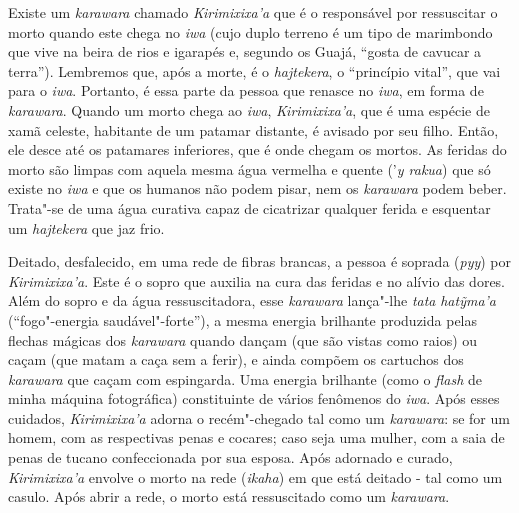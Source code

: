 Existe um \emph{karawara} chamado \emph{Kirimixixa'a} que é o
responsável por ressuscitar o morto quando este chega no \emph{iwa}
(cujo duplo terreno é um tipo de marimbondo que vive na beira de rios e
igarapés e, segundo os Guajá, ``gosta de cavucar a terra''). Lembremos
que, após a morte, é o \emph{hajtekera}, o ``princípio vital'', que vai
para o \emph{iwa}. Portanto, é essa parte da pessoa que renasce no
\emph{iwa}, em forma de \emph{karawara}. Quando um morto chega ao
\emph{iwa}, \emph{Kirimixixa'a}, que é uma espécie de xamã celeste,
habitante de um patamar distante, é avisado por seu filho. Então, ele
desce até os patamares inferiores, que é onde chegam os mortos. As
feridas do morto são limpas com aquela mesma água vermelha e quente
('\emph{y rakua}) que só existe no \emph{iwa} e que os humanos não podem
pisar, nem os \emph{karawara} podem beber. Trata"-se de uma água curativa
capaz de cicatrizar qualquer ferida e esquentar um \emph{hajtekera} que
jaz frio.

Deitado, desfalecido, em uma rede de fibras brancas, a pessoa é soprada
(\emph{pyy}) por \emph{Kirimixixa'a}. Este é o sopro que auxilia na cura
das feridas e no alívio das dores. Além do sopro e da água
ressuscitadora, esse \emph{karawara} lança"-lhe \emph{tata}
\emph{hatỹma'a} (``fogo"-energia saudável"-forte''), a mesma energia
brilhante produzida pelas flechas mágicas dos \emph{karawara} quando
dançam (que são vistas como raios) ou caçam (que matam a caça sem a
ferir), e ainda compõem os cartuchos dos \emph{karawara} que caçam com
espingarda. Uma energia brilhante (como o \emph{flash} de minha máquina
fotográfica) constituinte de vários fenômenos do \emph{iwa}. Após esses
cuidados, \emph{Kirimixixa'a} adorna o recém"-chegado tal como um
\emph{karawara}: se for um homem, com as respectivas penas e cocares;
caso seja uma mulher, com a saia de penas de tucano confeccionada por
sua esposa. Após adornado e curado, \emph{Kirimixixa'a} envolve o morto
na rede (\emph{ikaha}) em que está deitado - tal como um casulo. Após
abrir a rede, o morto está ressuscitado como um \emph{karawara}.

